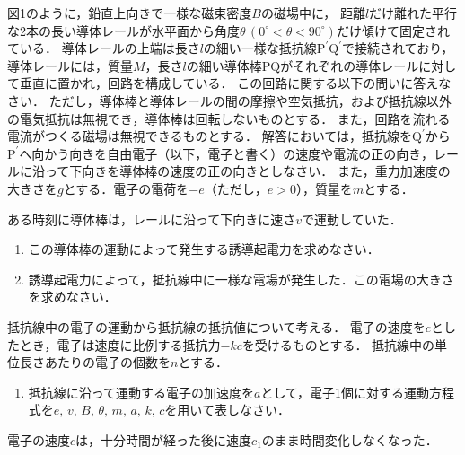 \setcounter{figure}{0}
図1のように，鉛直上向きで一様な磁束密度$B$の磁場中に，
距離$l$だけ離れた平行な2本の長い導体レールが水平面から角度$\theta\,(0^\circ <\theta <90^\circ)$だけ傾けて固定されている．
導体レールの上端は長さ$l$の細い一様な抵抗線$\text{P}^\prime\text{Q}^\prime$で接続されており，導体レールには，質量$M$，長さ$l$の細い導体棒$\text{PQ}$がそれぞれの導体レールに対して垂直に置かれ，回路を構成している．
この回路に関する以下の問いに答えなさい．
ただし，導体棒と導体レールの間の摩擦や空気抵抗，および抵抗線以外の電気抵抗は無視でき，導体棒は回転しないものとする．
また，回路を流れる電流がつくる磁場は無視できるものとする．
解答においては，抵抗線を$\text{Q}^\prime$から$\text{P}^\prime$へ向かう向きを自由電子（以下，電子と書く）の速度や電流の正の向き，レールに沿って下向きを導体棒の速度の正の向きとしなさい．
また，重力加速度の大きさを$g$とする．電子の電荷を$-e$（ただし，$e>0$），質量を$m$とする．

ある時刻に導体棒は，レールに沿って下向きに速さ$v$で運動していた．


\begin{enumerate}[（1）]
  \setlength{\leftskip}{-1zw}
  \setlength{\itemindent}{1zw}\setlength{\labelsep}{0.5zw}
  \setlength{\labelwidth}{1zw}\setlength{\leftmargin}{1zw}
  \setlength{\itemsep}{0.5\baselineskip}
  \item この導体棒の運動によって発生する誘導起電力を求めなさい．
  \item 誘導起電力によって，抵抗線中に一様な電場が発生した．この電場の大きさを求めなさい．
\end{enumerate}

抵抗線中の電子の運動から抵抗線の抵抗値について考える．
電子の速度を$c$としたとき，電子は速度に比例する抵抗力$-kc$を受けるものとする．
抵抗線中の単位長さあたりの電子の個数を$n$とする．

\begin{enumerate}[（1）]
  \setlength{\leftskip}{-1zw}
  \setlength{\itemindent}{1zw}\setlength{\labelsep}{0.5zw}
  \setlength{\labelwidth}{1zw}\setlength{\leftmargin}{1zw}
  \setlength{\itemsep}{0.5\baselineskip}
  \addtocounter{enumi}{2}
  \item 抵抗線に沿って運動する電子の加速度を$a$として，電子1個に対する運動方程式を$e,\,v,\,B,\,\theta,\,m,\,a,\,k,\,c$を用いて表しなさい．
\end{enumerate}

電子の速度$c$は，十分時間が経った後に速度$c_1$のまま時間変化しなくなった．


